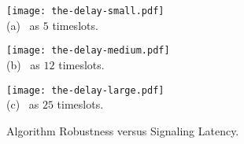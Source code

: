 \begin{figure*}[t!]                                                                %
    \centering                                                                      %
    \begin{minipage}[b]{0.30\textwidth}                                             %
        \texttt{[image: the-delay-small.pdf]} \\                  %
        {(a) \brlatency~as $5$ timeslots.}                                               %
    \end{minipage}                                                                  %
    \begin{minipage}[b]{0.30\textwidth}                                             %
        \texttt{[image: the-delay-medium.pdf]} \\                 %
        {(b) \brlatency~as $12$ timeslots.}           %
    \end{minipage}                                                                  %
    \begin{minipage}[b]{0.30\textwidth}                                             %
        \texttt{[image: the-delay-large.pdf]} \\                  %
        {(c) \brlatency~as $25$ timeslots.}             %
    \end{minipage}                                                                  %
    \caption{Algorithm Robustness versus Signaling Latency.}                        %
    \label{fig:ss_signal}                                                           %
\end{figure*}                                                                       %

